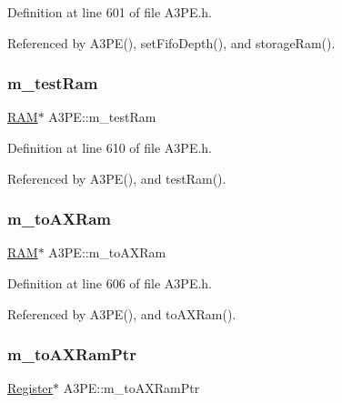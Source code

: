 Definition at line 601 of file A3\+P\+E.\+h.



Referenced by A3\+P\+E(), set\+Fifo\+Depth(), and storage\+Ram().

\mbox{\label{classA3PE_ad788e41ef5c674ab1a7671f3db0ffef6}} 
\subsubsection{\texorpdfstring{m\+\_\+test\+Ram}{m\_testRam}}
{\footnotesize\ttfamily \hyperlink{classRAM}{R\+AM}$\ast$ A3\+P\+E\+::m\+\_\+test\+Ram\hspace{0.3cm}{\ttfamily [private]}}



Definition at line 610 of file A3\+P\+E.\+h.



Referenced by A3\+P\+E(), and test\+Ram().

\mbox{\label{classA3PE_ae586a3d2fd21556e84e1af656e3430b5}} 
\subsubsection{\texorpdfstring{m\+\_\+to\+A\+X\+Ram}{m\_toAXRam}}
{\footnotesize\ttfamily \hyperlink{classRAM}{R\+AM}$\ast$ A3\+P\+E\+::m\+\_\+to\+A\+X\+Ram\hspace{0.3cm}{\ttfamily [private]}}



Definition at line 606 of file A3\+P\+E.\+h.



Referenced by A3\+P\+E(), and to\+A\+X\+Ram().

\mbox{\label{classA3PE_aae1b8b2e96bba94535bd4de766bd7e65}} 
\subsubsection{\texorpdfstring{m\+\_\+to\+A\+X\+Ram\+Ptr}{m\_toAXRamPtr}}
{\footnotesize\ttfamily \hyperlink{classRegister}{Register}$\ast$ A3\+P\+E\+::m\+\_\+to\+A\+X\+Ram\+Ptr\hspace{0.3cm}{\ttfamily [private]}}




